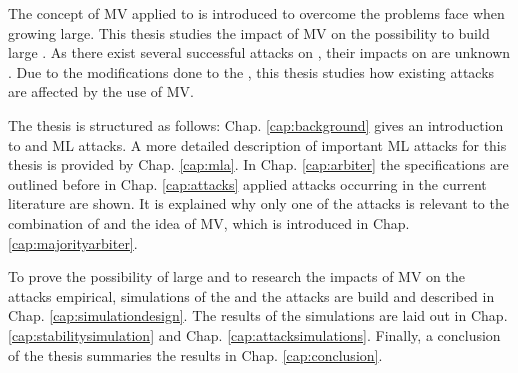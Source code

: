 The concept of \ac{MV} applied to \apufs is introduced to overcome the problems \xpufs face when growing large.
This thesis studies the impact of \ac{MV} on the possibility to build large \xpufs. %
As there exist several successful attacks on \apufs, their impacts on \mpufs are unknown \cite{Ganji2016PACPUFs,Ruhrmair2014PUFOverview}.
Due to the modifications done to the \apuf, this thesis studies how existing attacks are affected by the use of \ac{MV}.

The thesis is structured as follows: 
Chap. \ref{cap:background} gives an introduction to \pufs and \ac{ML} attacks.
A more detailed description of important \ac{ML} attacks for this thesis is provided by Chap. \ref{cap:mla}. %
In Chap. \ref{cap:arbiter} the \apuf specifications are outlined before in Chap. \ref{cap:attacks} applied attacks occurring in the current literature are shown.
It is explained why only one of the attacks is relevant to the combination of \xpufs and the idea of \ac{MV}, which is introduced in Chap. \ref{cap:majorityarbiter}. %

To prove the possibility of large \mxpufs and to research the impacts of \ac{MV} on the attacks empirical, simulations of the \pufs and the attacks are build and described in Chap. \ref{cap:simulationdesign}. %
The results of the simulations are laid out in Chap. \ref{cap:stabilitysimulation} and Chap. \ref{cap:attacksimulations}.
Finally, a conclusion of the thesis summaries the results in Chap. \ref{cap:conclusion}.

